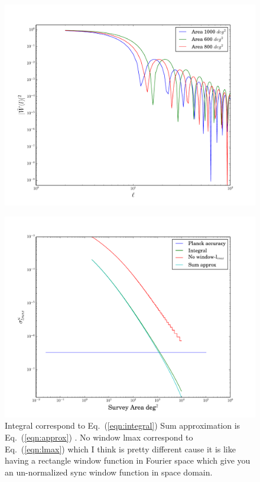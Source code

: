 \documentclass[prd,onecolumn,amsmath,amssymb,floatfix,superscriptaddress,notitlepage]{revtex4-1}
\newcommand{\refeq}[1]{Eq.~(\ref{eqn:#1})}
\begin{document}
\begin{figure}[htbp]
\begin{center}
\includegraphics[scale=0.6]{./images/window.pdf}
\end{center}
\end{figure}

\begin{figure}[htbp]
\begin{center}
\includegraphics[scale=0.6]{./images/variance.pdf}
\caption{Integral correspond to \refeq{integral} Sum approximation is \refeq{approx} . No window lmax correspond to \refeq{lmax} which I think is pretty different cause it is like having a rectangle window function in Fourier space which give you an un-normalized sync window function in space domain. }
\end{center}
\end{figure}
\end{document}
